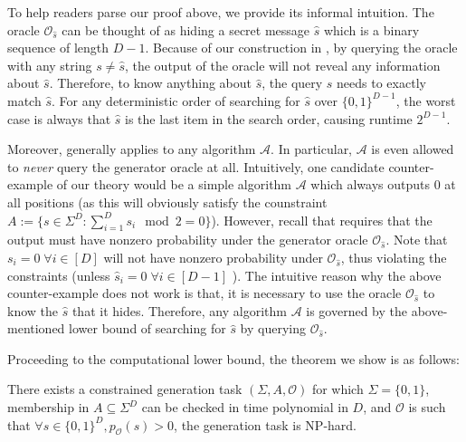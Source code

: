 \begin{remark}
    To help readers parse our proof above, we provide its informal intuition.
    The oracle $\mathcal{O}_{\hat{s}}$ can be thought of as hiding a secret message $\hat{s}$ which is a binary sequence of length $D-1$.
    Because of our construction in ,
    by querying the oracle with any string $s \ne \hat{s}$, 
    the output of the oracle will not reveal any information about $\hat{s}$.
    Therefore, to know anything about $\hat{s}$, 
    the query $s$ needs to exactly match $\hat{s}$.
    For any deterministic order of searching for $\hat{s}$ over $\{0,1\}^{D-1}$, 
    the worst case is always that $\hat{s}$ is the last item in the search order, causing runtime $2^{D-1}$.
    
    Moreover,  generally applies to any algorithm $\mathcal{A}$. 
    In particular, $\mathcal{A}$ is even allowed to \emph{never} query the generator oracle at all.
    Intuitively, one candidate counter-example of our theory would be 
    a simple algorithm $\mathcal{A}$ which always outputs 0 at all positions
    (as this will obviously satisfy the counstraint $A := \{s \in \Sigma^D: \sum_{i=1}^{D} s_i \mod 2 = 0 \}$).
    However, recall that  requires that 
    the output must have nonzero probability under the generator oracle $\mathcal{O}_{\hat{s}}$.
    Note that $s_i = 0 \; \forall i \in [D]$ will not have nonzero probability under $\mathcal{O}_{\hat{s}}$, 
    thus violating the constraints
    (unless $\hat{s}_i = 0 \; \forall i \in [D-1]$ ).
    The intuitive reason why the above counter-example does not work is that, 
    it is necessary to use the oracle $\mathcal{O}_{\hat{s}}$ to know the $\hat{s}$ that it hides. 
    Therefore, any algorithm $\mathcal{A}$ is governed by the above-mentioned lower bound of searching for $\hat{s}$ by querying $\mathcal{O}_{\hat{s}}$.
\end{remark}

Proceeding to the computational lower bound, the theorem we show is as follows:

\begin{theorem}
\label{thm:computational_lower_bound}
There exists a constrained generation task $(\Sigma, A, \mathcal{O})$ for which $\Sigma = \{0,1\}$, membership in $A \subseteq \Sigma^D$ can be checked in time polynomial in $D$, and $\mathcal{O}$ is such that $\forall s \in \{0,1\}^D, p_{\mathcal{O}}(s) > 0$, the generation task is NP-hard. \end{theorem}

